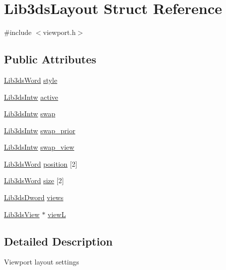 \hypertarget{struct_lib3ds_layout}{\section{Lib3ds\-Layout Struct Reference}
\label{struct_lib3ds_layout}
}


{\ttfamily \#include $<$viewport.\-h$>$}

\subsection*{Public Attributes}
\begin{DoxyCompactItemize}
\item 
\hyperlink{types_8h_a439f68d12f4ad080599044949e41dba1}{Lib3ds\-Word} \hyperlink{struct_lib3ds_layout_a770e9b04d593892297c92abbfebec7dd}{style}
\item 
\hyperlink{types_8h_ad6ca098afd6494c3cca6b63f136f59c8}{Lib3ds\-Intw} \hyperlink{struct_lib3ds_layout_a491bd85fe10158f50451a21a62002ea4}{active}
\item 
\hyperlink{types_8h_ad6ca098afd6494c3cca6b63f136f59c8}{Lib3ds\-Intw} \hyperlink{struct_lib3ds_layout_a48311641fd94dd288fa5d53d61875d1a}{swap}
\item 
\hyperlink{types_8h_ad6ca098afd6494c3cca6b63f136f59c8}{Lib3ds\-Intw} \hyperlink{struct_lib3ds_layout_aeddb2f985dd6e53a70d43801bf24e985}{swap\-\_\-prior}
\item 
\hyperlink{types_8h_ad6ca098afd6494c3cca6b63f136f59c8}{Lib3ds\-Intw} \hyperlink{struct_lib3ds_layout_ad3c94031e5c96722c7fc5828bcfc4950}{swap\-\_\-view}
\item 
\hyperlink{types_8h_a439f68d12f4ad080599044949e41dba1}{Lib3ds\-Word} \hyperlink{struct_lib3ds_layout_a7e59a51c39282db6dc9d76163d6cb0c7}{position} \mbox{[}2\mbox{]}
\item 
\hyperlink{types_8h_a439f68d12f4ad080599044949e41dba1}{Lib3ds\-Word} \hyperlink{struct_lib3ds_layout_ad3f8c67e1b9562d703525c36149a6819}{size} \mbox{[}2\mbox{]}
\item 
\hyperlink{types_8h_a299c9663303144c562f6bd92c2f273d3}{Lib3ds\-Dword} \hyperlink{struct_lib3ds_layout_a60d2ac0330e9fdc6531c5a0d55a7233f}{views}
\item 
\hyperlink{struct_lib3ds_view}{Lib3ds\-View} $\ast$ \hyperlink{struct_lib3ds_layout_a21737a2a72a8763432071c8d14c1957c}{view\-L}
\end{DoxyCompactItemize}


\subsection{Detailed Description}
Viewport layout settings 


